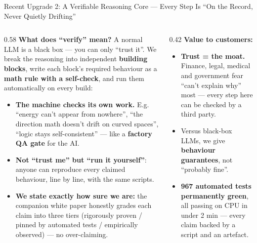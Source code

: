 ﻿\documentclass[aspectratio=169, 10pt]{beamer}
\begin{document}
\begin{frame}{Recent Upgrade 2: A Verifiable Reasoning Core --- Every Step Is ``On the Record, Never Quietly Drifting''}
\small
\begin{columns}
\begin{column}{0.58\textwidth}
\textbf{What does ``verify'' mean?} A normal LLM is a black box --- you can only ``trust it''. We break the reasoning into independent \textbf{building blocks}, write each block's required behaviour as a \textbf{math rule with a self-check}, and run them automatically on every build:
\begin{itemize}\itemsep=0.3em
    \item \textbf{The machine checks its own work.} E.g. ``energy can't appear from nowhere'', ``the direction math doesn't drift on curved spaces'', ``logic stays self-consistent'' --- like a \textbf{factory QA gate} for the AI.
    \item \textbf{Not ``trust me'' but ``run it yourself''}: anyone can reproduce every claimed behaviour, line by line, with the same scripts.
    \item \textbf{We state exactly how sure we are:} the companion white paper honestly grades each claim into three tiers (rigorously proven / pinned by automated tests / empirically observed) --- no over-claiming.
\end{itemize}
\end{column}
\begin{column}{0.42\textwidth}
\textbf{Value to customers:}
\begin{itemize}\itemsep=0.3em
    \item \textbf{Trust = the moat.} Finance, legal, medical and government fear ``can't explain why'' most --- every step here can be checked by a third party.
    \item Versus black-box LLMs, we give \textbf{behaviour guarantees}, not ``probably fine''.
    \item \textbf{967 automated tests permanently green}, all passing on CPU in under 2 min --- every claim backed by a script and an artefact.
\end{itemize}
\end{column}
\end{columns}
\end{frame}
\end{document}
